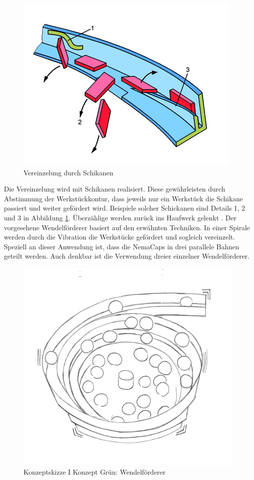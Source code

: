 \begin{figure}
	\includegraphics[scale=2.0]{Illustrationen/5-Konzept/schikane.png}
	\caption{Vereinzelung durch Schikanen \protect\cite{handling_online}}
	\label{fig:schikane}
\end{figure}


Die Vereinzelung wird mit Schikanen realisiert. Diese gewährleisten durch Abstimmung der Werkstückkontur, dass jeweils nur ein Werkstück die Schikane passiert und weiter gefördert wird. Beispiele solcher Schickanen sind Details 1, 2 und 3 in Abbildung \ref{fig:schikane}. Überzählige werden zurück ins Haufwerk gelenkt \cite{handling_online}.
\newline
Der vorgesehene Wendelförderer basiert auf den erwähnten Techniken. In einer Spirale werden durch die Vibration die Werkstücke gefördert und sogleich vereinzelt. Speziell an dieser Anwendung ist, dass die NemaCaps in drei parallele Bahnen geteilt werden. Auch denkbar ist die Verwendung dreier einzelner Wendelförderer.

\begin{figure}[H]
	\includegraphics[scale=0.5]{Illustrationen/5-Konzept/green_wendelfoerderer.jpg}
	\caption{Konzeptskizze I Konzept Grün: Wendelförderer}
	\label{fig:vereinzelung_green}
\end{figure}


